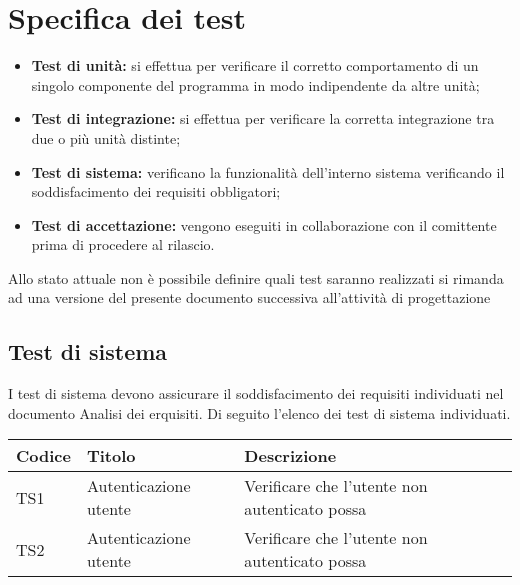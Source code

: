 \section{Specifica dei test}
\begin{itemize}
    \item \textbf{Test di unità:} si effettua per verificare il corretto comportamento di un singolo componente del programma in modo indipendente da altre unità;
    \item \textbf{Test di integrazione:} si effettua per verificare la corretta integrazione tra due o più unità distinte;
    \item \textbf{Test di sistema:} verificano la funzionalità dell'interno sistema verificando il soddisfacimento dei requisiti obbligatori;
    \item \textbf{Test di accettazione:} vengono eseguiti in collaborazione con il comittente prima di procedere al rilascio.
\end{itemize}

Allo stato attuale non è possibile definire quali test saranno realizzati si rimanda ad una versione del presente documento successiva all'attività di progettazione


\subsection{Test di sistema}

I test di sistema devono assicurare il soddisfacimento dei requisiti individuati nel documento Analisi dei erquisiti. 
Di seguito l'elenco dei test di sistema individuati.

\begin{center}
	\begin{longtable}{|p{1cm}|p{6.85cm}|p{7cm}|}
	\hline
	\rowcolor{lighter-grayer}
	\textbf{Codice} & \textbf{Titolo} & \textbf{Descrizione} \\
	\hline
	\endfirsthead



	\hline
	TS1 & Autenticazione utente & Verificare che l'utente non autenticato possa  \\
	TS2 & Autenticazione utente & Verificare che l'utente non autenticato possa  \\

	\hline

	\end{longtable}
\end{center}

